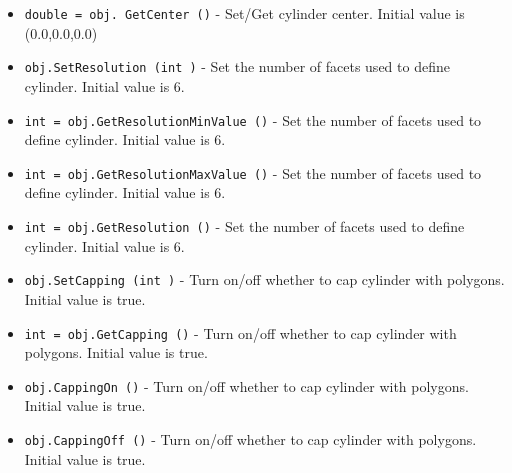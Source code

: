 \begin{itemize}
\item  \verb|double = obj. GetCenter ()| -  Set/Get cylinder center. Initial value is (0.0,0.0,0.0)

\item  \verb|obj.SetResolution (int )| -  Set the number of facets used to define cylinder. Initial value is 6.

\item  \verb|int = obj.GetResolutionMinValue ()| -  Set the number of facets used to define cylinder. Initial value is 6.

\item  \verb|int = obj.GetResolutionMaxValue ()| -  Set the number of facets used to define cylinder. Initial value is 6.

\item  \verb|int = obj.GetResolution ()| -  Set the number of facets used to define cylinder. Initial value is 6.

\item  \verb|obj.SetCapping (int )| -  Turn on/off whether to cap cylinder with polygons. Initial value is true.

\item  \verb|int = obj.GetCapping ()| -  Turn on/off whether to cap cylinder with polygons. Initial value is true.

\item  \verb|obj.CappingOn ()| -  Turn on/off whether to cap cylinder with polygons. Initial value is true.

\item  \verb|obj.CappingOff ()| -  Turn on/off whether to cap cylinder with polygons. Initial value is true.

\end{itemize}
